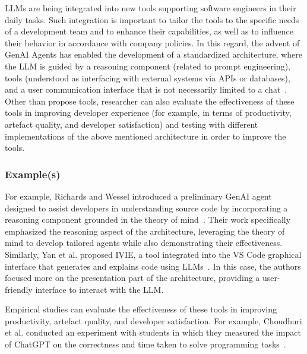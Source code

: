 LLMs are being integrated into new tools supporting software engineers in their daily tasks.
Such integration is important to tailor the tools to the specific needs of a development team and to enhance their capabilities, as well as to influence their behavior in accordance with company policies.
In this regard, the advent of GenAI Agents has enabled the development of a standardized architecture, where the LLM is guided by a reasoning component (related to prompt engineering), tools (understood as interfacing with external systems via APIs or databases), and a user communication interface that is not necessarily limited to a chat~\cite{DBLP:conf/icsm/RichardsW24, DBLP:journals/tmlr/SumersYN024, DBLP:journals/corr/abs-2309-07870}.
Other than propose tools, researcher can also evaluate the effectiveness of these tools in improving developer experience (for example, in terms of productivity, artefact quality, and developer satisfaction) and testing with different implementations of the above mentioned architecture in order to improve the tools.

\subsubsection{Example(s)}

For example, Richards and Wessel introduced a preliminary GenAI agent designed to assist developers in understanding source code by incorporating a reasoning component grounded in the theory of mind~\cite{DBLP:conf/icsm/RichardsW24}. Their work specifically emphasized the reasoning aspect of the architecture, leveraging the theory of mind to develop tailored agents while also demonstrating their effectiveness.
Similarly, Yan et al. proposed IVIE, a tool integrated into the VS Code graphical interface that generates and explains code using LLMs~\cite{DBLP:conf/chi/YanHWH24}. In this case, the authors focused more on the presentation part of the architecture, providing a user-friendly interface to interact with the LLM. 

Empirical studies can evaluate the effectiveness of these tools in improving productivity, artefact quality, and developer satisfaction.
For example, Choudhuri et al. conducted an experiment with students in which they measured the impact of ChatGPT on the correctness and time taken to solve programming tasks~\cite{DBLP:conf/icse/ChoudhuriLSGS24}.

